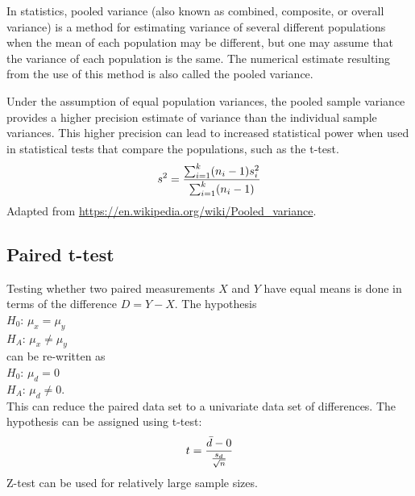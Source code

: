 \begin{*anmerkung}
	In statistics, pooled variance (also known as combined, composite, or overall variance) is a method for estimating variance of several different populations when the mean of each population may be different, but one may assume that the variance of each population is the same. The numerical estimate resulting from the use of this method is also called the pooled variance.
	
	Under the assumption of equal population variances, the pooled sample variance provides a higher precision estimate of variance than the individual sample variances. This higher precision can lead to increased statistical power when used in statistical tests that compare the populations, such as the t-test.
	\begin{align}
		s^2 = \frac{\sum_{i=1}^k (n_i-1)s_i^2}{\sum_{i=1}^k (n_i-1)} \notag
	\end{align}
	Adapted from \url{https://en.wikipedia.org/wiki/Pooled_variance}.
\end{*anmerkung}

\subsection{Paired t-test}

Testing whether two paired measurements $X$ and $Y$ have equal means is done in terms of the difference $D=Y-X$. The hypothesis \\
$H_0$: $\mu_x = \mu_y$ \\
$H_A$: $\mu_x\neq \mu_y$ \\
can be re-written as \\
$H_0$: $\mu_d=0$ \\
$H_A$: $\mu_d\neq 0$. \\
This can reduce the paired data set to a univariate data set of differences. The hypothesis can be assigned using t-test:
\begin{align}
	t = \frac{\bar{d}-0}{\frac{s_d}{\sqrt{n}}} \notag
\end{align}
Z-test can be used for relatively large sample sizes.

